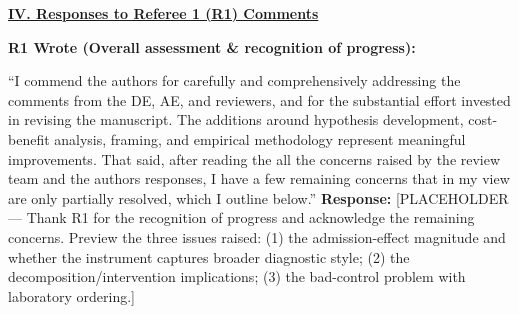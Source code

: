 \documentclass[11pt]{article}
\newenvironment{quote2}
{ \bigskip
\noindent
         \small\em
         \baselineskip=14pt
}
\newcommand{\1}{\hbox{\rm 1\kern-.35em 1}}
\begin{document}
\clearpage


\pagestyle{fancy}
\fancyhead{}
\renewcommand{\headrulewidth}{0pt}

\noindent\underline{\textbf{IV. Responses to Referee 1 (R1) Comments}}

\begin{quote2}
\textbf{R1 Wrote (Overall assessment \& recognition of progress):}

\noindent ``I commend the authors for carefully and comprehensively addressing the comments from the DE, AE, and reviewers, and for the substantial effort invested in revising the manuscript. The additions around hypothesis development, cost-benefit analysis, framing, and empirical methodology represent meaningful improvements. That said, after reading the all the concerns raised by the review team and the authors responses, I have a few remaining concerns that in my view are only partially resolved, which I outline below.''
\end{quote2}

\noindent\textbf{Response:} \color{blue}[PLACEHOLDER --- Thank R1 for the recognition of progress and acknowledge the remaining concerns. Preview the three issues raised: (1) the admission-effect magnitude and whether the instrument captures broader diagnostic style; (2) the decomposition/intervention implications; (3) the bad-control problem with laboratory ordering.]
\color{black}
\end{document}
